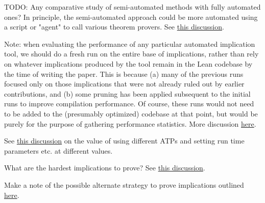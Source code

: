 TODO: Any comparative study of semi-automated methods with fully automated ones? In principle, the semi-automated approach could be more automated using a script or "agent" to call various theorem provers. See \href{https://leanprover.zulipchat.com/#narrow/stream/458659-Equational/topic/A.20magma.20of.20order.20.3C.2013.20-.20for.20Equation2531.3F}{this discussion}.

Note: when evaluating the performance of any particular automated implication tool, we should do a fresh run on the entire base of implications, rather than rely on whatever implications produced by the tool remain in the Lean codebase by the time of writing the paper. This is because (a) many of the previous runs focused only on those implications that were not already ruled out by earlier contributions, and (b) some pruning has been applied subsequent to the initial runs to improve compilation performance. Of course, these runs would not need to be added to the (presumably optimized) codebase at that point, but would be purely for the purpose of gathering performance statistics. More discussion \href{https://leanprover.zulipchat.com/#narrow/stream/458659-Equational/topic/RECORDS.20REQUEST.3A.20data.20and.20performance.20automated.20run.20metrics}{here}.

See \href{https://leanprover.zulipchat.com/#narrow/channel/458659-Equational/topic/1516.20-.3E.20255/near/481547543}{this discussion} on the value of using different ATPs and setting run time parameters etc. at different values.

What are the hardest implications to prove?  See \href{https://leanprover.zulipchat.com/#narrow/channel/458659-Equational/topic/What.20are.20the.20hardest.20positive.20implications.20for.20an.20ATP.3F}{this discussion}.

Make a note of the possible alternate strategy to prove implications outlined \href{https://leanprover.zulipchat.com/#narrow/stream/458659-Equational/topic/Ideas.20for.20unknown.20implications}{here}.
